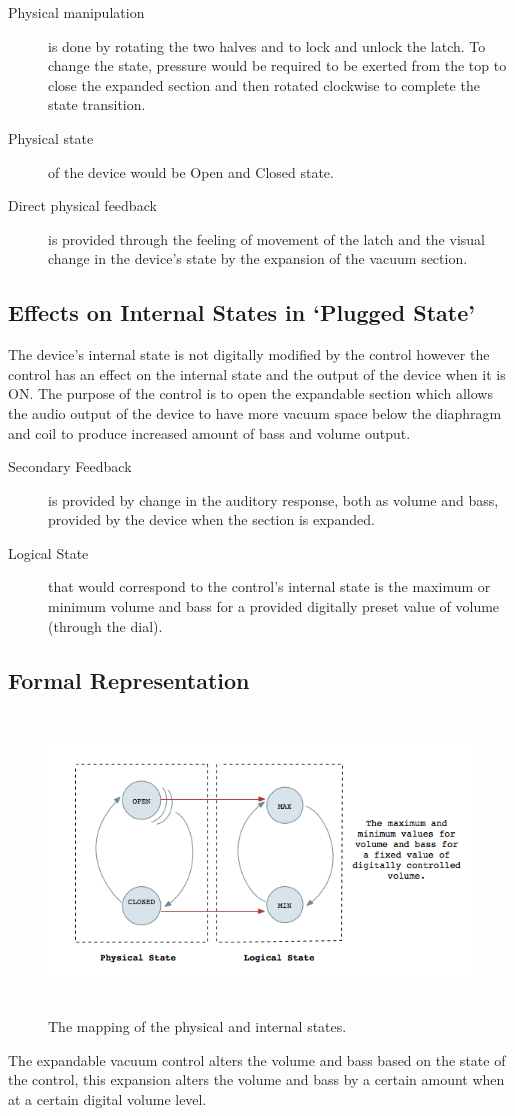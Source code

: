 \documentclass[10pt,a4paper]{article}
\begin{document}
\begin{description}

\item [Physical manipulation] is done by rotating the two halves and to lock and unlock the latch. To change the state, pressure would be required to be exerted from the top to close the expanded section and then rotated clockwise to complete the state transition.
\item [Physical state] of the device would be Open and Closed state.
\item [Direct physical feedback] is provided through the feeling of movement of the latch and the visual change in the device's state by the expansion of the vacuum section.
\end{description}

 
\subsection{Effects on Internal States in `Plugged State'}
The device's internal state is not digitally modified by the control however the control has an effect on the internal state and the output of the device when it is ON. The purpose of the control is to open the expandable section which allows the audio output of the device to have more vacuum space below the diaphragm and coil to produce increased amount of bass and volume output.

\begin{description}
\item [Secondary Feedback] is provided by change in the auditory response, both as volume and bass, provided by the device when the section is expanded.
\item [Logical State] that would correspond to the control's internal state is the maximum or minimum volume and bass for a provided digitally preset value of volume (through the dial).
\end{description}

\subsection{Formal Representation}

\begin{figure}[hbpt]
\centerline{\includegraphics[width=556px,height=300px,keepaspectratio]{EV2}}
\caption {The mapping of the physical and internal states.}
\label{physical_state_power_switch}
\end{figure}

\noindent
The expandable vacuum control alters the volume and bass based on the state of the control, this expansion alters the volume and bass by a certain amount when at a certain digital volume level. 
\end{document}
